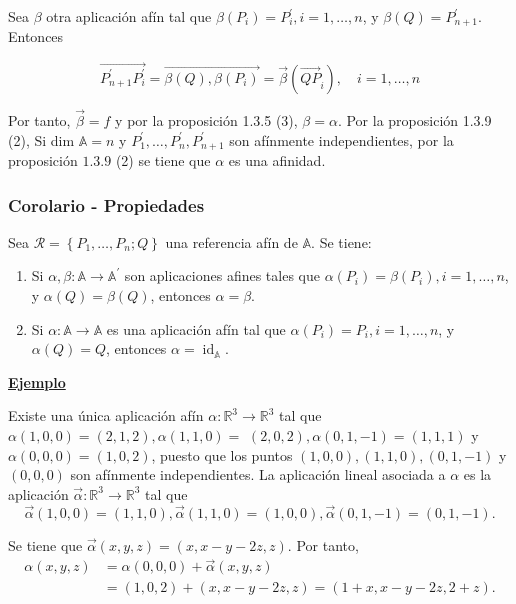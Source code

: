 \documentclass[12pt, a4paper, ones, notitlepage, openany,titlepage]{article}
\newcommand{\ejemplo}{\noindent\underline{\textbf{Ejemplo}}}
\begin{document}
\noindent Sea $\beta$ otra aplicación afín tal que $\beta\left(P_{i}\right)=P_{i}^{\prime}, i=1, \ldots, n$, y $\beta(Q)=P_{n+1}^{\prime}$. Entonces

$$
\overrightarrow{P_{n+1}^{\prime} P_{i}^{\prime}}=\overrightarrow{\beta(Q), \beta\left(P_{i}\right)}=\overrightarrow{\beta}\left(\overrightarrow{Q P}_{i}\right), \quad i=1, \ldots, n
$$

Por tanto, $\overrightarrow{\beta}=f$ y por la proposición 1.3.5 (3), $\beta=\alpha$. Por la proposición 1.3.9 (2), Si dim $\mathbb{A}=n$ y $P_{1}^{\prime}, \ldots, P_{n}^{\prime}, P_{n+1}^{\prime}$ son afínmente independientes, por la proposición $1.3 .9$ (2) se tiene que $\alpha$ es una afinidad.

\subsubsection{Corolario - Propiedades}
\noindent Sea $\mathcal{R}=\left\{P_{1}, \ldots, P_{n} ; Q\right\}$ una referencia afín de $\mathbb{A}$. Se tiene:

\begin{enumerate}[label=(\arabic*)]

\item Si $\alpha, \beta: \mathbb{A} \rightarrow \mathbb{A}^{\prime}$ son aplicaciones afines tales que $\alpha\left(P_{i}\right)=\beta\left(P_{i}\right), i=1, \ldots, n$, y $\alpha(Q)=\beta(Q)$, entonces $\alpha=\beta$.

\item Si $\alpha: \mathbb{A} \rightarrow \mathbb{A}$ es una aplicación afín tal que $\alpha\left(P_{i}\right)=P_{i}, i=1, \ldots, n$, y $\alpha(Q)=Q$, entonces $\alpha=\operatorname{id}_{\mathbb{A}}$.

\end{enumerate}

\ejemplo

Existe una única aplicación afín $\alpha: \mathbb{R}^{3} \rightarrow \mathbb{R}^{3}$ tal que $\alpha(1,0,0)=(2,1,2), \alpha(1,1,0)=$ $(2,0,2), \alpha(0,1,-1)=(1,1,1)$ y $\alpha(0,0,0)=(1,0,2)$, puesto que los puntos $(1,0,0),(1,1,0),(0,1,-1)$ y $(0,0,0)$ son afínmente independientes. La aplicación lineal asociada a $\alpha$ es la aplicación $\overrightarrow{\alpha}: \mathbb{R}^{3} \rightarrow \mathbb{R}^{3}$ tal que
$$
\overrightarrow{\alpha}(1,0,0)=(1,1,0), \overrightarrow{\alpha}(1,1,0)=(1,0,0), \overrightarrow{\alpha}(0,1,-1)=(0,1,-1) .
$$

\noindent Se tiene que $\overrightarrow{\alpha}(x, y, z)=(x, x-y-2 z, z)$. Por tanto,
$$
\begin{aligned}
\alpha(x, y, z) & =\alpha(0,0,0)+\overrightarrow{\alpha}(x, y, z) \\
& =(1,0,2)+(x, x-y-2 z, z)=(1+x, x-y-2 z, 2+z) .
\end{aligned}
$$
\end{document}
